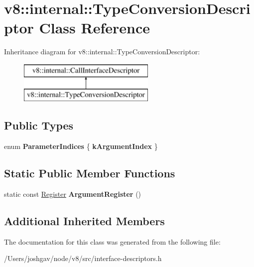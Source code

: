 \hypertarget{classv8_1_1internal_1_1_type_conversion_descriptor}{}\section{v8\+:\+:internal\+:\+:Type\+Conversion\+Descriptor Class Reference}
\label{classv8_1_1internal_1_1_type_conversion_descriptor}
Inheritance diagram for v8\+:\+:internal\+:\+:Type\+Conversion\+Descriptor\+:\begin{figure}[H]
\begin{center}
\leavevmode
\includegraphics[height=2.000000cm]{classv8_1_1internal_1_1_type_conversion_descriptor}
\end{center}
\end{figure}
\subsection*{Public Types}
\begin{DoxyCompactItemize}
\item 
enum {\bfseries Parameter\+Indices} \{ {\bfseries k\+Argument\+Index}
 \}\hypertarget{classv8_1_1internal_1_1_type_conversion_descriptor_a50ca8dcb1f7ff51b0d7f04caf17f665f}{}\label{classv8_1_1internal_1_1_type_conversion_descriptor_a50ca8dcb1f7ff51b0d7f04caf17f665f}

\end{DoxyCompactItemize}
\subsection*{Static Public Member Functions}
\begin{DoxyCompactItemize}
\item 
static const \hyperlink{structv8_1_1internal_1_1_register}{Register} {\bfseries Argument\+Register} ()\hypertarget{classv8_1_1internal_1_1_type_conversion_descriptor_ae829b79a7bf57fad4bb6d1aadb709a83}{}\label{classv8_1_1internal_1_1_type_conversion_descriptor_ae829b79a7bf57fad4bb6d1aadb709a83}

\end{DoxyCompactItemize}
\subsection*{Additional Inherited Members}


The documentation for this class was generated from the following file\+:\begin{DoxyCompactItemize}
\item 
/\+Users/joshgav/node/v8/src/interface-\/descriptors.\+h\end{DoxyCompactItemize}
